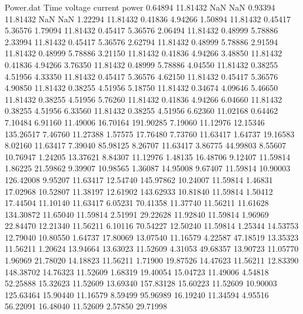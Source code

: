 \begin{filecontents}{Power.dat}
Time voltage current power
   0.64894   11.81432        NaN        NaN
   0.93394   11.81432        NaN        NaN
   1.22294   11.81432    0.41836    4.94266
   1.50894   11.81432    0.45417    5.36576
   1.79094   11.81432    0.45417    5.36576
   2.06494   11.81432    0.48999    5.78886
   2.33994   11.81432    0.45417    5.36576
   2.62794   11.81432    0.48999    5.78886
   2.91594   11.81432    0.48999    5.78886
   3.21150   11.81432    0.41836    4.94266
   3.48850   11.81432    0.41836    4.94266
   3.76350   11.81432    0.48999    5.78886
   4.04550   11.81432    0.38255    4.51956
   4.33350   11.81432    0.45417    5.36576
   4.62150   11.81432    0.45417    5.36576
   4.90850   11.81432    0.38255    4.51956
   5.18750   11.81432    0.34674    4.09646
   5.46650   11.81432    0.38255    4.51956
   5.76260   11.81432    0.41836    4.94266
   6.04660   11.81432    0.38255    4.51956
   6.33560   11.81432    0.38255    4.51956
   6.62360   11.02168    0.64462    7.10484
   6.91160   11.49006   16.70164  191.90285
   7.19060   11.12976   12.15346  135.26517
   7.46760   11.27388    1.57575   17.76480
   7.73760   11.63417    1.64737   19.16583
   8.02160   11.63417    7.39040   85.98125
   8.26707   11.63417    3.86775   44.99803
   8.55607   10.76947    1.24205   13.37621
   8.84307   11.12976    1.48135   16.48706
   9.12407   11.59814    1.86225   21.59862
   9.39907   10.98565    1.36087   14.95008
   9.67407   11.59814   10.90003  126.42008
   9.95207   11.63417   12.54740  145.97862
  10.24007   11.59814    1.46831   17.02968
  10.52807   11.38197   12.61902  143.62933
  10.81840   11.59814    1.50412   17.44504
  11.10140   11.63417    6.05231   70.41358
  11.37740   11.56211   11.61628  134.30872
  11.65040   11.59814    2.51991   29.22628
  11.92840   11.59814    1.96969   22.84470
  12.21340   11.56211    6.10116   70.54227
  12.50240   11.59814    1.25344   14.53753
  12.79040   10.80550    1.64737   17.80069
  13.07540   11.16579    4.22587   47.18519
  13.35323   11.56211    1.20624   13.94664
  13.63023   11.52609    4.31053   49.68357
  13.90723   11.05770    1.96969   21.78020
  14.18823   11.56211    1.71900   19.87526
  14.47623   11.56211   12.83390  148.38702
  14.76323   11.52609    1.68319   19.40054
  15.04723   11.49006    4.54818   52.25888
  15.32623   11.52609   13.69340  157.83128
  15.60223   11.52609   10.90003  125.63464
  15.90440   11.16579    8.59499   95.96989
  16.19240   11.34594    4.95516   56.22091
  16.48040   11.52609    2.57850   29.71998

\end{filecontents}
